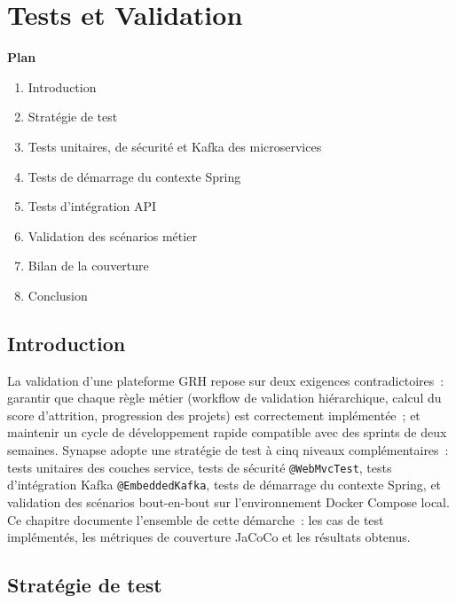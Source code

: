 ﻿%

\chapter{Tests et Validation}

\noindent\textbf{Plan}
\begin{enumerate}
  \item Introduction
  \item Stratégie de test
  \item Tests unitaires, de sécurité et Kafka des microservices
  \item Tests de démarrage du contexte Spring
  \item Tests d'intégration API
  \item Validation des scénarios métier
  \item Bilan de la couverture
  \item Conclusion
\end{enumerate}

\section{Introduction}

La validation d'une plateforme GRH repose sur deux exigences contradictoires~:
garantir que chaque règle métier (workflow de validation hiérarchique, calcul
du score d'attrition, progression des projets) est correctement implémentée~;
et maintenir un cycle de développement rapide compatible avec des sprints de deux
semaines. Synapse adopte une stratégie de test à cinq niveaux complémentaires~:
tests unitaires des couches service, tests de sécurité \texttt{@WebMvcTest},
tests d'intégration Kafka \texttt{@EmbeddedKafka}, tests de démarrage du contexte
Spring, et validation des scénarios bout-en-bout sur l'environnement Docker Compose
local. Ce chapitre documente l'ensemble de cette démarche~: les cas de test
implémentés, les métriques de couverture JaCoCo et les résultats obtenus.

\section{Stratégie de test}

